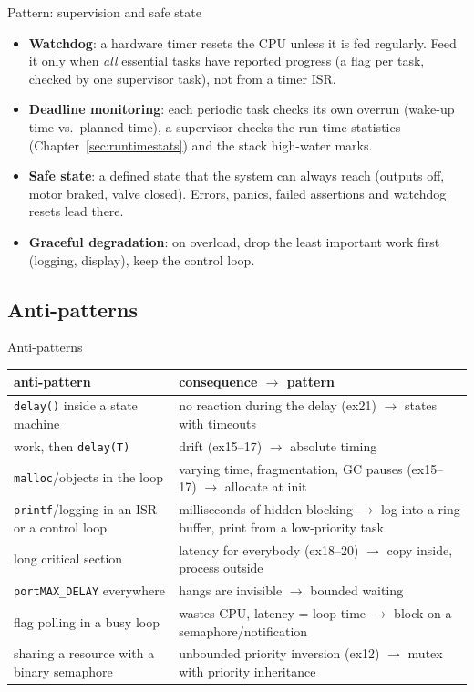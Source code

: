 \begin{frame}{Pattern: supervision and safe state}
  \begin{itemize}
    \item \textbf{Watchdog}: a hardware timer resets the CPU unless it is fed regularly. Feed it only when \emph{all} essential tasks have reported progress (a flag per task, checked by one supervisor task), not from a timer ISR.
    \item \textbf{Deadline monitoring}: each periodic task checks its own overrun (wake-up time vs.\ planned time), a supervisor checks the run-time statistics (Chapter~\ref{sec:runtimestats}) and the stack high-water marks.
    \item \textbf{Safe state}: a defined state that the system can always reach (outputs off, motor braked, valve closed). Errors, panics, failed assertions and watchdog resets lead there.
    \item \textbf{Graceful degradation}: on overload, drop the least important work first (logging, display), keep the control loop.
  \end{itemize}
\end{frame}

\subsection{Anti-patterns}
\begin{frame}{Anti-patterns}
  \begin{center}\footnotesize
  \begin{tabular}{@{}p{}p{}@{}}
    \toprule
    anti-pattern & consequence $\rightarrow$ pattern \\
    \midrule
    \texttt{delay()} inside a state machine & no reaction during the delay (ex21) $\rightarrow$ states with timeouts \\
    work, then \texttt{delay(T)} & drift (ex15--17) $\rightarrow$ absolute timing \\
    \texttt{malloc}/objects in the loop & varying time, fragmentation, GC pauses (ex15--17) $\rightarrow$ allocate at init \\
    \texttt{printf}/logging in an ISR or a control loop & milliseconds of hidden blocking $\rightarrow$ log into a ring buffer, print from a low-priority task \\
    long critical section & latency for everybody (ex18--20) $\rightarrow$ copy inside, process outside \\
    \texttt{portMAX\_DELAY} everywhere & hangs are invisible $\rightarrow$ bounded waiting \\
    flag polling in a busy loop & wastes CPU, latency = loop time $\rightarrow$ block on a semaphore/notification \\
    sharing a resource with a binary semaphore & unbounded priority inversion (ex12) $\rightarrow$ mutex with priority inheritance \\
    \bottomrule
  \end{tabular}
  \end{center}
\end{frame}

